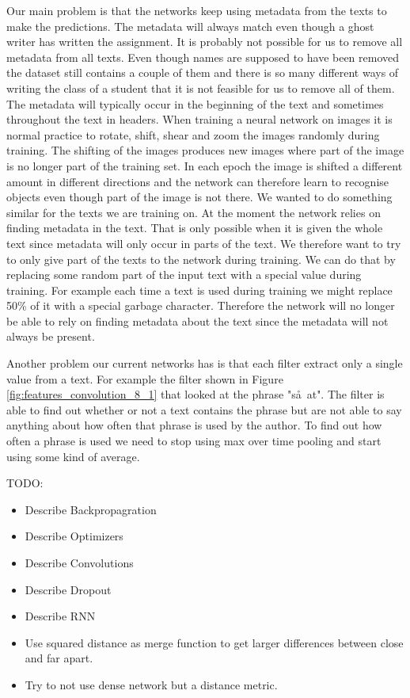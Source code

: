 Our main problem is that the networks keep using metadata from the texts to
make the predictions. The metadata will always match even though a ghost writer
has written the assignment. It is probably not possible for us to remove all
metadata from all texts. Even though names are supposed to have been removed
the dataset still contains a couple of them and there is so many different ways
of writing the class of a student that it is not feasible for us to remove
all of them. The metadata will typically occur in the beginning of the text
and sometimes throughout the text in headers. When training a neural network
on images it is normal practice to rotate, shift, shear and zoom the images
randomly during training. The shifting of the images produces new images where
part of the image is no longer part of the training set. In each epoch the
image is shifted a different amount in different directions and the network can
therefore learn to recognise objects even though part of the image is not there.
We wanted to do something similar for the texts we are training on. At the
moment the network relies on finding metadata in the text. That is only possible
when it is given the whole text since metadata will only occur in parts of the
text. We therefore want to try to only give part of the texts to the network
during training. We can do that by replacing some random part of the input text
with a special value during training. For example each time a text is used
during training we might replace 50\% of it with a special garbage character.
Therefore the network will no longer be able to rely on finding metadata about
the text since the metadata will not always be present.

Another problem our current networks has is that each filter extract
only a single value from a text. For example the filter shown in Figure
\ref{fig:features_convolution_8_1} that looked at the phrase "s\aa\ at". The
filter is able to find out whether or not a text contains the phrase but are not
able to say anything about how often that phrase is used by the author. To find
out how often a phrase is used we need to stop using max over time pooling and
start using some kind of average.

TODO:
\begin{itemize}
    \item Describe Backpropagration
    \item Describe Optimizers
    \item Describe Convolutions
    \item Describe Dropout
    \item Describe RNN
    \item Use squared distance as merge function to get larger differences
        between close and far apart.
    \item Try to not use dense network but a distance metric.
\end{itemize}
